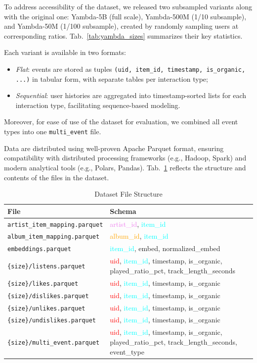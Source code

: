 \documentclass[sigconf,authorversion,nonacm]{acmart}
\begin{document}
To address accessibility of the dataset, we released two subsampled variants along with the original one: Yambda-5B (full scale), Yambda-500M (1/10 subsample), and Yambda-50M (1/100 subsample), created by randomly sampling users at corresponding ratios. Tab.~\ref{tab:yambda_sizes} summarizes their key statistics.

Each variant is available in two formats:
\begin{itemize}
    \item \textit{Flat}: events are stored as tuples \texttt{(uid, item\_id, timestamp, is\_organic, ...)} in tabular form, with separate tables per interaction type;
    \item \textit{Sequential}: user histories are aggregated into timestamp-sorted lists for each interaction type, facilitating sequence-based modeling.
\end{itemize}

Moreover, for ease of use of the dataset for evaluation, we combined all event types into one \texttt{multi\_event} file.

Data are distributed using well-proven Apache Parquet format, ensuring compatibility with distributed processing frameworks (e.g., Hadoop, Spark) and modern analytical tools (e.g., Polars, Pandas). Tab.~\ref{tab:file_structure} reflects the structure and contents of the files in the dataset.

\begin{table}
  \caption{Dataset File Structure}
  \label{tab:file_structure}
  \begin{tabular}{ll}
    \toprule
    File & Schema \\
    \midrule
    \texttt{artist\_item\_mapping.parquet} & \textcolor{violet}{artist\_id}, \textcolor{cyan}{item\_id} \\
    \texttt{album\_item\_mapping.parquet} & \textcolor{orange}{album\_id}, \textcolor{cyan}{item\_id} \\
    \texttt{embeddings.parquet} & \textcolor{cyan}{item\_id}, embed, normalized\_embed \\
    \texttt{\{size\}/listens.parquet} & \textcolor{red}{uid}, \textcolor{cyan}{item\_id}, timestamp, is\_organic, played\_ratio\_pct, track\_length\_seconds \\
    \texttt{\{size\}/likes.parquet} & \textcolor{red}{uid}, \textcolor{cyan}{item\_id}, timestamp, is\_organic \\
    \texttt{\{size\}/dislikes.parquet} & \textcolor{red}{uid}, \textcolor{cyan}{item\_id}, timestamp, is\_organic \\
    \texttt{\{size\}/unlikes.parquet} & \textcolor{red}{uid}, \textcolor{cyan}{item\_id}, timestamp, is\_organic \\
    \texttt{\{size\}/undislikes.parquet} & \textcolor{red}{uid}, \textcolor{cyan}{item\_id}, timestamp, is\_organic \\
    \texttt{\{size\}/multi\_event.parquet} & \textcolor{red}{uid}, \textcolor{cyan}{item\_id}, timestamp, is\_organic, played\_ratio\_pct, track\_length\_seconds, event\_type \\
    \bottomrule
  \end{tabular}
\end{table}
\end{document}
